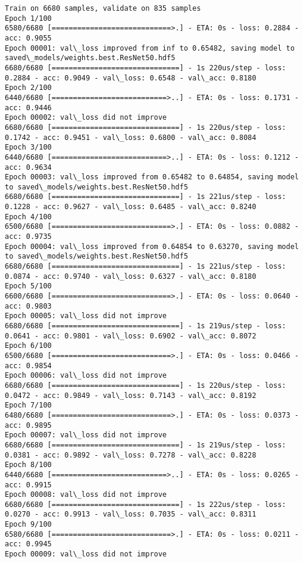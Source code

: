 \documentclass[11pt]{article}
\begin{document}
    \begin{Verbatim}[commandchars=\\\{\}]
Train on 6680 samples, validate on 835 samples
Epoch 1/100
6580/6680 [============================>.] - ETA: 0s - loss: 0.2884 - acc: 0.9055
Epoch 00001: val\_loss improved from inf to 0.65482, saving model to saved\_models/weights.best.ResNet50.hdf5
6680/6680 [==============================] - 1s 220us/step - loss: 0.2884 - acc: 0.9049 - val\_loss: 0.6548 - val\_acc: 0.8180
Epoch 2/100
6440/6680 [===========================>..] - ETA: 0s - loss: 0.1731 - acc: 0.9446
Epoch 00002: val\_loss did not improve
6680/6680 [==============================] - 1s 220us/step - loss: 0.1742 - acc: 0.9451 - val\_loss: 0.6800 - val\_acc: 0.8084
Epoch 3/100
6440/6680 [===========================>..] - ETA: 0s - loss: 0.1212 - acc: 0.9634
Epoch 00003: val\_loss improved from 0.65482 to 0.64854, saving model to saved\_models/weights.best.ResNet50.hdf5
6680/6680 [==============================] - 1s 221us/step - loss: 0.1228 - acc: 0.9627 - val\_loss: 0.6485 - val\_acc: 0.8240
Epoch 4/100
6500/6680 [============================>.] - ETA: 0s - loss: 0.0882 - acc: 0.9735
Epoch 00004: val\_loss improved from 0.64854 to 0.63270, saving model to saved\_models/weights.best.ResNet50.hdf5
6680/6680 [==============================] - 1s 221us/step - loss: 0.0874 - acc: 0.9740 - val\_loss: 0.6327 - val\_acc: 0.8180
Epoch 5/100
6600/6680 [============================>.] - ETA: 0s - loss: 0.0640 - acc: 0.9803
Epoch 00005: val\_loss did not improve
6680/6680 [==============================] - 1s 219us/step - loss: 0.0641 - acc: 0.9801 - val\_loss: 0.6902 - val\_acc: 0.8072
Epoch 6/100
6500/6680 [============================>.] - ETA: 0s - loss: 0.0466 - acc: 0.9854
Epoch 00006: val\_loss did not improve
6680/6680 [==============================] - 1s 220us/step - loss: 0.0472 - acc: 0.9849 - val\_loss: 0.7143 - val\_acc: 0.8192
Epoch 7/100
6480/6680 [============================>.] - ETA: 0s - loss: 0.0373 - acc: 0.9895
Epoch 00007: val\_loss did not improve
6680/6680 [==============================] - 1s 219us/step - loss: 0.0381 - acc: 0.9892 - val\_loss: 0.7278 - val\_acc: 0.8228
Epoch 8/100
6440/6680 [===========================>..] - ETA: 0s - loss: 0.0265 - acc: 0.9915
Epoch 00008: val\_loss did not improve
6680/6680 [==============================] - 1s 222us/step - loss: 0.0270 - acc: 0.9913 - val\_loss: 0.7035 - val\_acc: 0.8311
Epoch 9/100
6580/6680 [============================>.] - ETA: 0s - loss: 0.0211 - acc: 0.9945
Epoch 00009: val\_loss did not improve

\end{Verbatim}
\end{document}
